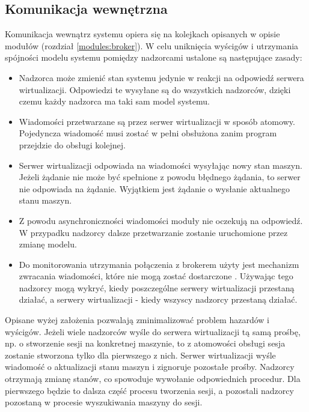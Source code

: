 \documentclass[../opis-rozwiazania.tex]{subfiles}
\begin{document}
\label{communication}

\subsection{Komunikacja wewnętrzna}
\label{communication:broker}

Komunikacja wewnątrz systemu opiera się na kolejkach opisanych w opisie modułów (rozdział \ref{modules:broker}). W celu uniknięcia wyścigów i utrzymania spójności modelu systemu pomiędzy nadzorcami ustalone są następujące zasady:
\begin{itemize}
  \item Nadzorca może zmienić stan systemu jedynie w reakcji na odpowiedź serwera wirtualizacji. Odpowiedzi te wysyłane są do wszystkich nadzorców, dzięki czemu każdy nadzorca ma taki sam model systemu.
  \item Wiadomości przetwarzane są przez serwer wirtualizacji w sposób atomowy. Pojedyncza wiadomość musi zostać w pełni obsłużona zanim program przejdzie do obsługi kolejnej.
  \item Serwer wirtualizacji odpowiada na wiadomości wysyłając nowy stan maszyn. Jeżeli żądanie nie może być spełnione z powodu błędnego żądania, to serwer nie odpowiada na żądanie. Wyjątkiem jest żądanie o wysłanie aktualnego stanu maszyn.
  \item Z powodu asynchroniczności wiadomości moduły nie oczekują na odpowiedź. W przypadku nadzorcy dalsze przetwarzanie zostanie uruchomione przez zmianę modelu.
  \item Do monitorowania utrzymania połączenia z brokerem użyty jest mechanizm zwracania wiadomości, które nie mogą zostać dostarczone \parencite{rabbit-unroutable}. Używając tego nadzorcy mogą wykryć, kiedy poszczególne serwery wirtualizacji przestaną działać, a serwery wirtualizacji - kiedy wszyscy nadzorcy przestaną działać.
\end{itemize}

Opisane wyżej założenia pozwalają zminimalizować problem hazardów i wyścigów. Jeżeli wiele nadzorców wyśle do serwera wirtualizacji tą samą prośbę, np. o stworzenie sesji na konkretnej maszynie, to z atomowości obsługi sesja zostanie stworzona tylko dla pierwszego z nich. Serwer wirtualizacji wyśle wiadomość o aktualizacji stanu maszyn i zignoruje pozostałe prośby. Nadzorcy otrzymają zmianę stanów, co spowoduje wywołanie odpowiednich procedur. Dla pierwszego będzie to dalsza część procesu tworzenia sesji, a pozostali nadzorcy pozostaną w procesie wyszukiwania maszyny do sesji.
\end{document}
